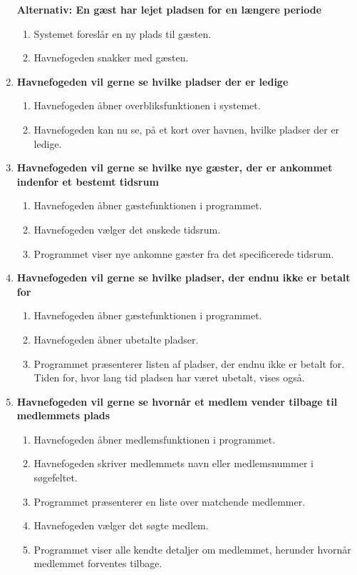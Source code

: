\begin{enumerate}
    \textbf{Alternativ: En gæst har lejet pladsen for en længere periode}
      \begin{enumerate}
        \item Systemet foreslår en ny plads til gæsten.
        \item Havnefogeden snakker med gæsten.
      \end{enumerate}

    \item{\textbf{Havnefogeden vil gerne se hvilke pladser der er ledige}}
      \begin{enumerate}
        \item Havnefogeden åbner overbliksfunktionen i systemet.
        \item Havnefogeden kan nu se, på et kort over havnen, hvilke pladser der er ledige.
      \end{enumerate}

    \item{\textbf{Havnefogeden vil gerne se hvilke nye gæster, der er ankommet indenfor et bestemt tidsrum}}
      \begin{enumerate}
        \item Havnefogeden åbner gæstefunktionen i programmet.
        \item Havnefogeden vælger det ønskede tidsrum.
        \item Programmet viser nye ankomne gæster fra det specificerede tidsrum.
      \end{enumerate}

    \item{\textbf{Havnefogeden vil gerne se hvilke pladser, der endnu ikke er betalt for}}
      \begin{enumerate}
        \item Havnefogeden åbner gæstefunktionen i programmet.
        \item Havnefogeden åbner ubetalte pladser.
        \item Programmet præsenterer listen af pladser, der endnu ikke er betalt for. Tiden for, hvor lang tid pladsen har været ubetalt, vises også.
      \end{enumerate}

    \item{\textbf{Havnefogeden vil gerne se hvornår et medlem vender tilbage til medlemmets plads}}
      \begin{enumerate}
        \item Havnefogeden åbner medlemsfunktionen i programmet.
        \item Havnefogeden skriver medlemmets navn eller medlemsnummer i søgefeltet.
        \item Programmet præsenterer en liste over matchende medlemmer.
        \item Havnefogeden vælger det søgte medlem.
        \item Programmet viser alle kendte detaljer om medlemmet, herunder hvornår medlemmet forventes tilbage.
      \end{enumerate}


\end{enumerate}
